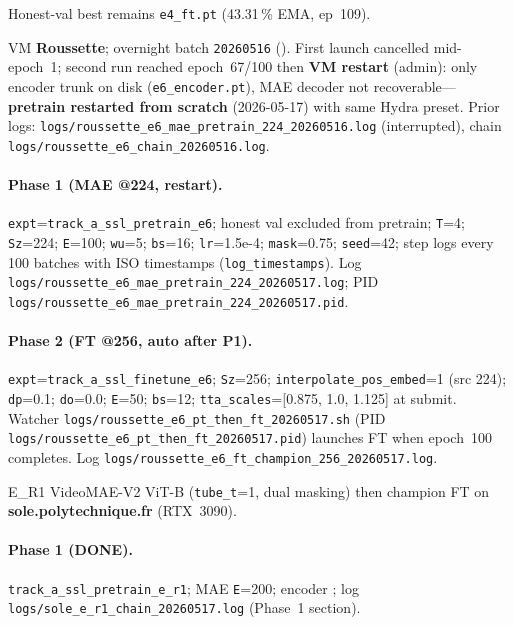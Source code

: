 \begin{table}[ht]
\begin{minipage}{\linewidth}
\begin{description}[leftmargin=1.5em, style=nextline]
  Honest-val best remains \texttt{e4\_ft.pt} (43.31\,\% EMA, ep~109).
\item[\textbf{Batch E6 / roussette} (RUNNING --- P1 restart)]
  VM \textbf{Roussette}; overnight batch \texttt{20260516}
  ().  First launch cancelled mid-epoch~1;
  second run reached epoch~67/100 then \textbf{VM restart} (admin): only
  encoder trunk on disk (\texttt{e6\_encoder.pt}), MAE decoder not recoverable---
  \textbf{pretrain restarted from scratch} (2026-05-17) with same Hydra preset.
  Prior logs: \texttt{logs/roussette\_e6\_mae\_pretrain\_224\_20260516.log}
  (interrupted), chain \texttt{logs/roussette\_e6\_chain\_20260516.log}.
  \paragraph{Phase 1 (MAE @224, restart).}
  \texttt{expt}=\texttt{track\_a\_ssl\_pretrain\_e6}; honest val excluded from
  pretrain; \texttt{T}=4; \texttt{Sz}=224; \texttt{E}=100; \texttt{wu}=5;
  \texttt{bs}=16; \texttt{lr}=1.5e-4; \texttt{mask}=0.75; \texttt{seed}=42;
  step logs every 100 batches with ISO timestamps (\texttt{log\_timestamps}).
  Log \texttt{logs/roussette\_e6\_mae\_pretrain\_224\_20260517.log};
  PID \texttt{logs/roussette\_e6\_mae\_pretrain\_224\_20260517.pid}.
  \paragraph{Phase 2 (FT @256, auto after P1).}
  \texttt{expt}=\texttt{track\_a\_ssl\_finetune\_e6}; \texttt{Sz}=256;
  \texttt{interpolate\_pos\_embed}=1 (src 224); \texttt{dp}=0.1;
  \texttt{do}=0.0; \texttt{E}=50; \texttt{bs}=12;
  \texttt{tta\_scales}=[0.875, 1.0, 1.125] at submit.
  Watcher \texttt{logs/roussette\_e6\_pt\_then\_ft\_20260517.sh} (PID
  \texttt{logs/roussette\_e6\_pt\_then\_ft\_20260517.pid}) launches FT when
  epoch~100 completes.
  Log \texttt{logs/roussette\_e6\_ft\_champion\_256\_20260517.log}.
\item[\textbf{Run E\_R1 (Sole, 20260517)} (RUNNING)]
  E\_R1 VideoMAE-V2 ViT-B (\texttt{tube\_t}=1, dual masking) then champion FT on
  \textbf{sole.polytechnique.fr} (RTX~3090).
  \paragraph{Phase 1 (DONE).} \texttt{track\_a\_ssl\_pretrain\_e\_r1};
  MAE \texttt{E}=200; encoder ;
  log \texttt{logs/sole\_e\_r1\_chain\_20260517.log} (Phase~1 section).

\end{description}
\end{minipage}
\end{table}
